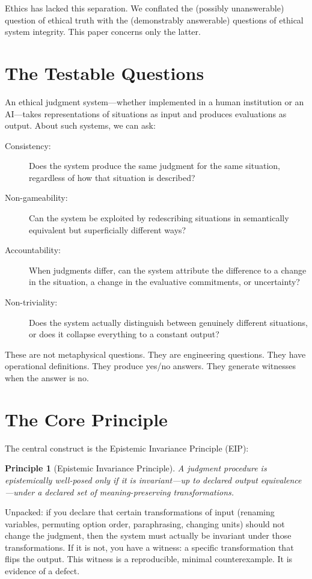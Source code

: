 \documentclass[12pt]{article}
\newtheorem{principle}{Principle}
\begin{document}
Ethics has lacked this separation. We conflated the (possibly unanswerable) question
of ethical truth with the (demonstrably answerable) questions of ethical system
integrity. This paper concerns only the latter.

\section{The Testable Questions}

An ethical judgment system---whether implemented in a human institution or an
AI---takes representations of situations as input and produces evaluations as output.
About such systems, we can ask:

\begin{description}
  \item[Consistency:] Does the system produce the same judgment for the same
    situation, regardless of how that situation is described?
  \item[Non-gameability:] Can the system be exploited by redescribing situations in
    semantically equivalent but superficially different ways?
  \item[Accountability:] When judgments differ, can the system attribute the
    difference to a change in the situation, a change in the evaluative
    commitments, or uncertainty?
  \item[Non-triviality:] Does the system actually distinguish between genuinely
    different situations, or does it collapse everything to a constant output?
\end{description}

These are not metaphysical questions. They are engineering questions. They have
operational definitions. They produce yes/no answers. They generate witnesses when
the answer is no.

\section{The Core Principle}

The central construct is the Epistemic Invariance Principle (EIP):

\begin{principle}[Epistemic Invariance Principle]
A judgment procedure is epistemically well-posed only if it is
invariant---up to declared output equivalence---under a declared set of
meaning-preserving transformations.
\end{principle}

Unpacked: if you declare that certain transformations of input (renaming variables,
permuting option order, paraphrasing, changing units) should not change the
judgment, then the system must actually be invariant under those transformations. If
it is not, you have a witness: a specific transformation that flips the output. This
witness is a reproducible, minimal counterexample. It is evidence of a defect.
\end{document}
